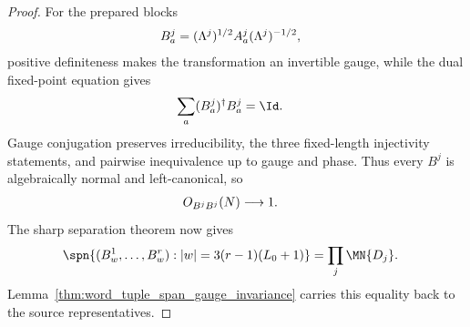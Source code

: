 \begin{proof}
    \leanok
    For the prepared blocks
    \begin{align}
        B^j_a & =(\Lambda^j)^{1/2}A^j_a(\Lambda^j)^{-1/2}, \notag
    \end{align}
    positive definiteness makes the transformation an invertible gauge, while
    the dual fixed-point equation gives
    \begin{align}
        \sum_a(B^j_a)^\dagger B^j_a & =\Id. \notag
    \end{align}
    Gauge conjugation preserves irreducibility, the three fixed-length
    injectivity statements, and pairwise inequivalence up to gauge and phase.
    Thus every $B^j$ is algebraically normal and left-canonical, so
    \begin{align}
        O_{B^jB^j}(N) & \longrightarrow1. \notag
    \end{align}
    The sharp separation theorem now gives
    \begin{align}
        \spn\{(B^1_w,\ldots,B^r_w):|w|=3(r-1)(L_0+1)\}
         & =\prod_j\MN{D_j}. \notag
    \end{align}
    Lemma~\ref{thm:word_tuple_span_gauge_invariance} carries this equality
    back to the source representatives.
\end{proof}

